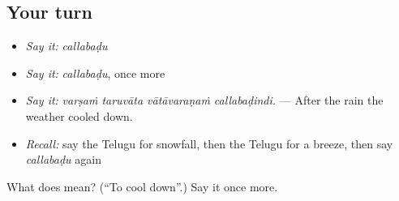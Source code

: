 \subsection*{Your turn}
\begin{itemize}
\raggedright
  \item \emph{Say it:} \emph{callabaḍu}
  \item \emph{Say it:} \emph{callabaḍu}, once more
  \item \emph{Say it:} \emph{varṣaṁ taruvāta vātāvaraṇaṁ callabaḍindi.} — After the rain the weather cooled down.
  \item \emph{Recall:} say the Telugu for snowfall, then the Telugu for a breeze, then say \emph{callabaḍu} again
\end{itemize}

\begin{tcolorbox}[breakable,colback=teal!4,colframe=teal!35!black,title={Before you move on}]
What does  mean? (\textquotedblleft{}To cool down\textquotedblright{}.) Say it once more.
\end{tcolorbox}
